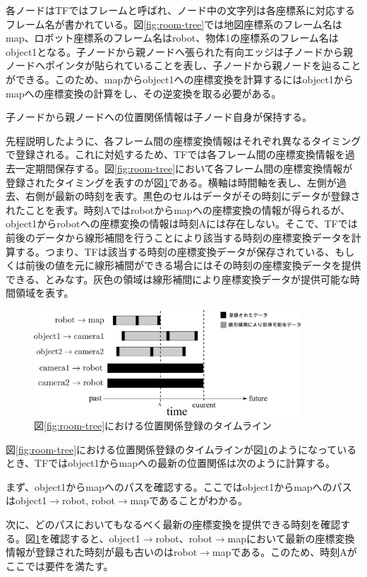 \documentclass[a4paper]{jreport}	%
\begin{document}
各ノードはTFではフレームと呼ばれ、ノード中の文字列は各座標系に対応するフレーム名が書かれている。図\ref{fig:room-tree}では地図座標系のフレーム名はmap、ロボット座標系のフレーム名はrobot、物体1の座標系のフレーム名はobject1となる。子ノードから親ノードへ張られた有向エッジは子ノードから親ノードへポインタが貼られていることを表し、子ノードから親ノードを辿ることができる。このため、mapからobject1への座標変換を計算するにはobject1からmapへの座標変換の計算をし、その逆変換を取る必要がある。

子ノードから親ノードへの位置関係情報は子ノード自身が保持する。

先程説明したように、各フレーム間の座標変換情報はそれぞれ異なるタイミングで登録される。これに対処するため、TFでは各フレーム間の座標変換情報を過去一定期間保存する。図\ref{fig:room-tree}において各フレーム間の座標変換情報が登録されたタイミングを表すのが図\ref{fig:room-timeline}である。横軸は時間軸を表し、左側が過去、右側が最新の時刻を表す。黒色のセルはデータがその時刻にデータが登録されたことを表す。時刻Aではrobotからmapへの座標変換の情報が得られるが、object1からrobotへの座標変換の情報は時刻Aには存在しない。そこで、TFでは前後のデータから線形補間を行うことにより該当する時刻の座標変換データを計算する。つまり、TFは該当する時刻の座標変換データが保存されている、もしくは前後の値を元に線形補間ができる場合にはその時刻の座標変換データを提供できる、とみなす。灰色の領域は線形補間により座標変換データが提供可能な時間領域を表す。

\begin{figure}[h] 
\centering
\includegraphics[width=10cm]{room-timeline}	
\caption{図\ref{fig:room-tree}における位置関係登録のタイムライン}
\label{fig:room-timeline}
\end{figure}

図\ref{fig:room-tree}における位置関係登録のタイムラインが図\ref{fig:room-timeline}のようになっているとき、TFではobject1からmapへの最新の位置関係は次のように計算する。

まず、object1からmapへのパスを確認する。ここではobject1からmapへのパスはobject1$\rightarrow$robot, robot$\rightarrow$mapであることがわかる。

次に、どのパスにおいてもなるべく最新の座標変換を提供できる時刻を確認する。図\ref{fig:room-timeline}を確認すると、object1$\rightarrow$robot、robot$\rightarrow$mapにおいて最新の座標変換情報が登録された時刻が最も古いのはrobot$\rightarrow$mapである。このため、時刻Aがここでは要件を満たす。
\end{document}
